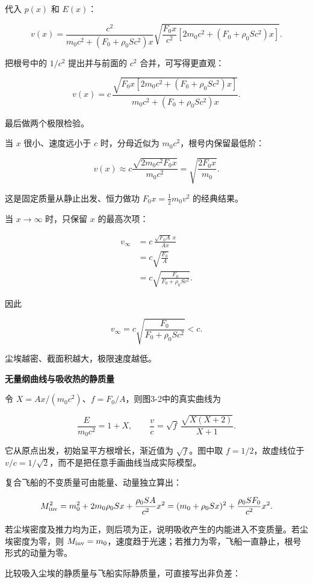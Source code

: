 \documentclass[12pt,a4paper,UTF8]{ctexart}
\begin{document}
代入 \(p(x)\) 和 \(E(x)\)：

\[v(x)=
\frac{c^2}{
m_0c^2+\left(F_0+\rho_0Sc^2\right)x
}
\sqrt{
\frac{F_0x}{c^2}
\left[
2m_0c^2+\left(F_0+\rho_0Sc^2\right)x
\right]
}.\]

把根号中的 \(1/c^2\) 提出并与前面的 \(c^2\) 合并，可写得更直观：

\[\boxed{
v(x)=
c\,
\frac{
\sqrt{
F_0x\left[
2m_0c^2+\left(F_0+\rho_0Sc^2\right)x
\right]
}
}{
m_0c^2+\left(F_0+\rho_0Sc^2\right)x
}
}.\]

最后做两个极限检验。

当 \(x\) 很小、速度远小于 \(c\) 时，分母近似为
\(m_0c^2\)，根号内保留最低阶：

\[v(x)\approx
c\frac{\sqrt{2m_0c^2F_0x}}{m_0c^2}
=\sqrt{\frac{2F_0x}{m_0}}.\]

这是固定质量从静止出发、恒力做功 \(F_0x=\tfrac12m_0v^2\) 的经典结果。

当 \(x\to\infty\) 时，只保留 \(x\) 的最高次项：

\[\begin{aligned}
v_\infty
&=c\,
\frac{\sqrt{F_0A}\,x}{Ax}\\
&=c\sqrt{\frac{F_0}{A}}\\
&=c\sqrt{
\frac{F_0}{F_0+\rho_0Sc^2}
}.
\end{aligned}\]

因此

\[\boxed{
v_\infty
=c\sqrt{
\frac{F_0}{F_0+\rho_0Sc^2}
}<c
}.\]

尘埃越密、截面积越大，极限速度越低。

\textbf{无量纲曲线与吸收热的静质量}

令 \(X=Ax/(m_0c^2)\)、\(f=F_0/A\)，则图3-2中的真实曲线为

\[\frac{E}{m_0c^2}=1+X,\qquad
\frac vc=\sqrt f\,\frac{\sqrt{X(X+2)}}{X+1}.\]

它从原点出发，初始呈平方根增长，渐近值为 \(\sqrt f\)。图中取
\(f=1/2\)，故虚线位于
\(v/c=1/\sqrt2\)，而不是把任意手画曲线当成实际模型。

复合飞船的不变质量可由能量、动量独立算出：

\[M_{\rm inv}^2=m_0^2+2m_0\rho_0Sx
+\frac{\rho_0SA}{c^2}x^2
=(m_0+\rho_0Sx)^2+\frac{\rho_0SF_0}{c^2}x^2.\]

若尘埃密度及推力均为正，则后项为正，说明吸收产生的内能进入不变质量。若尘埃密度为零，则
\(M_{\rm inv}=m_0\)，速度趋于光速；若推力为零，飞船一直静止，根号形式的动量为零。

比较吸入尘埃的静质量与飞船实际静质量，可直接写出非负差：
\end{document}
